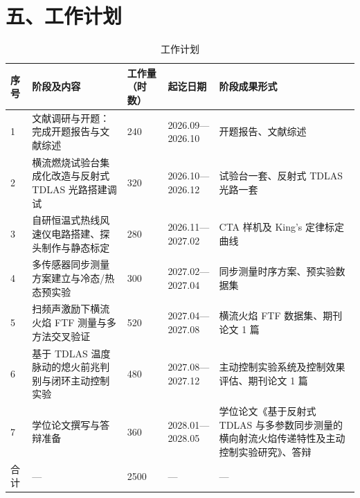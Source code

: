 \documentclass[UTF8,a4paper,zihao=-4,fontset=windows]{ctexart}
\begin{document}
\section{五、工作计划}
\begin{table}[H]
\centering
{}
\caption{工作计划}
\setlength{\tabcolsep}{2pt}
\begin{tabular}{p{0.9cm} p{4.3cm} p{2.1cm} p{3.1cm} p{3.1cm}}
\toprule
序号 & 阶段及内容 & 工作量\newline（时数） & 起讫日期 & 阶段成果形式 \\
\midrule
1 & 文献调研与开题：完成开题报告与文献综述 & 240 & 2026.09—2026.10 & 开题报告、文献综述 \\
2 & 横流燃烧试验台集成化改造与反射式 TDLAS 光路搭建调试 & 320 & 2026.10—2026.12 & 试验台一套、反射式 TDLAS 光路一套 \\
3 & 自研恒温式热线风速仪电路搭建、探头制作与静态标定 & 280 & 2026.11—2027.02 & CTA 样机及 \mbox{King's} 定律标定曲线 \\
4 & 多传感器同步测量方案建立与冷态/热态预实验 & 300 & 2027.02—2027.04 & 同步测量时序方案、预实验数据集 \\
5 & 扫频声激励下横流火焰 FTF 测量与多方法交叉验证 & 520 & 2027.04—2027.08 & 横流火焰 FTF 数据集、期刊论文 1 篇 \\
6 & 基于 TDLAS 温度脉动的熄火前兆判别与闭环主动控制实验 & 480 & 2027.08—2027.12 & 主动控制实验系统及控制效果评估、期刊论文 1 篇 \\
7 & 学位论文撰写与答辩准备 & 360 & 2028.01—2028.05 & 学位论文《基于反射式 TDLAS 与多参数同步测量的横向射流火焰传递特性及主动控制实验研究》、答辩 \\
\midrule
合计 & — & 2500 & — & — \\
\bottomrule
\end{tabular}
\end{table}
\vspace{0.4\baselineskip}
\clearpage
\end{document}
